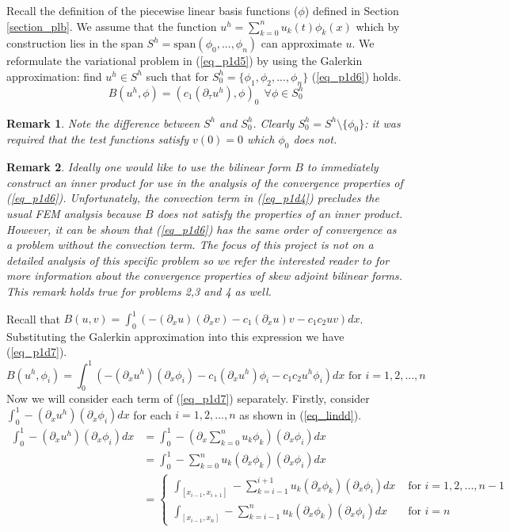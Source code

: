 \documentclass[11pt,fleqn]{article}
\theoremstyle{defstyle}
\newtheorem{rmrk}{Remark}[section]
\begin{document}
Recall the definition of the piecewise linear basis functions ($\phi$) defined in Section \ref{section_plb}. We assume that the function $u^h =\sum^n_{k=0} u_k(t) \phi_k(x)$ which by construction lies in the span $S^h=\text{span}(\phi_0,...,\phi_n)$ can approximate $u$. We reformulate the variational problem in (\ref{eq_p1d5}) by using the Galerkin approximation: find $u^h \in S^h$ such that for $S^h_0=\{\phi_1, \phi_2,...,\phi_n \}$ (\ref{eq_p1d6}) holds.
\begin{equation}
B(u^h, \phi) = (c_1(\partial_{\tau}u^h),\phi)_0~~\forall \phi \in S^h_0
\label{eq_p1d6}
\end{equation} 
\begin{rmrk}
Note the difference between $S^h$ and $S^h_0$. Clearly $S^h_0=S^h\setminus \{\phi_0\}$: it was required that the test functions satisfy $v(0)=0$ which $\phi_0$ does not. 
\end{rmrk}
\begin{rmrk}
Ideally one would like to use the bilinear form $B$ to immediately construct an inner product for use in the analysis of the convergence properties of (\ref{eq_p1d6}). Unfortunately, the convection term in (\ref{eq_p1d4}) precludes the usual \cite{vrb} FEM analysis because $B$ does not satisfy the properties of an inner product. However, it can be shown \cite{strang} that (\ref{eq_p1d6}) has the same order of convergence as a problem without the convection term. The focus of this project is not on a detailed analysis of this specific problem so we refer the interested reader to \cite{strang} for more information about the convergence properties of skew adjoint bilinear forms. This remark holds true for problems 2,3 and 4 as well.
\end{rmrk}
Recall that $B(u, v) = \int_0^1 (-(\partial_xu)(\partial_xv) - c_1(\partial_xu)v - c_1c_2uv)dx$. Substituting the Galerkin approximation into this expression we have (\ref{eq_p1d7}).
\begin{equation}
B(u^h, \phi_i) = \int_0^1 (-(\partial_xu^h)(\partial_x\phi_i) - c_1(\partial_xu^h)\phi_i - c_1c_2u^h\phi_i)dx \text{ for } i=1,2,...,n
\label{eq_p1d7}
\end{equation}
Now we will consider each term of (\ref{eq_p1d7}) separately. Firstly, consider $\int_0^1 -(\partial_xu^h)(\partial_x\phi_i)dx$ for each $i=1,2,...,n$ as shown in (\ref{eq_lindd}).
\begin{equation}
\begin{aligned}
\int_0^1 -(\partial_xu^h)(\partial_x\phi_i)dx &= \int_0^1 -(\partial_x \sum_{k=0}^{n} u_k\phi_k)(\partial_x\phi_i)dx \\
&= \int_0^1 -\sum_{k=0}^{n} u_k(\partial_x\phi_k)(\partial_x\phi_i)dx \\
&= \begin{cases}
\int_{[x_{i-1},x_{i+1}]}-\sum_{k=i-1}^{i+1} u_k(\partial_x\phi_k)(\partial_x\phi_i)dx &\text{ for } i=1,2,..., n-1 \\
\int_{[x_{i-1},x_{n}]}-\sum_{k=i-1}^{n} u_k(\partial_x\phi_k)(\partial_x\phi_i)dx &\text{ for } i=n
\end{cases}
\end{aligned}
\label{eq_lindd}
\end{equation}
\end{document}
